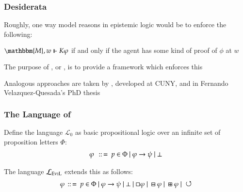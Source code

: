\begin{frame}
\frametitle{Desiderata}
\begin{itemizedot}
  \item Roughly, one way model reasons in epistemic logic would be to enforce
  the following:
  
  \begin{center}
    $\mathbbm{M}, w \Vdash K \phi$ if and only if the agent has some kind of
    proof of $\phi$ at $w$
  \end{center}
  
  \item The purpose of , or , is
  to provide a framework which enforces this
  
  \item Analogous approaches are taken by ,
  developed at CUNY, and in Fernando Velazquez-Quesada's PhD thesis
\end{itemizedot}
\end{frame}
\begin{frame}
\frametitle{The Language of }
\begin{itemizedot}
  \item Define the language $\mathcal{L}_0$ as basic propositional logic over
  an infinite set of proposition letters $\Phi$:
  \[ \varphi \text{ } \,::\, = \text{ } p \in \Phi \text{ } | \text{ } \varphi
     \rightarrow \psi \text{ } | \text{ } \bot \]
  \item The language $\mathcal{L}_{\text{\textsc{EviL}}}$ extends this as
  follows:
  \[ \varphi \,::\, = \text{ } p \in \Phi \text{ } | \text{ } \varphi \rightarrow
     \psi \text{ } | \text{ } \bot \text{ } | \text{ } \Box  \varphi \text{ } |
     \text{ } \boxminus \varphi \text{ } | \text{ } \boxplus \varphi \text{ } |
     \text{ } \circlearrowleft \]
\end{itemizedot}
\end{frame}
